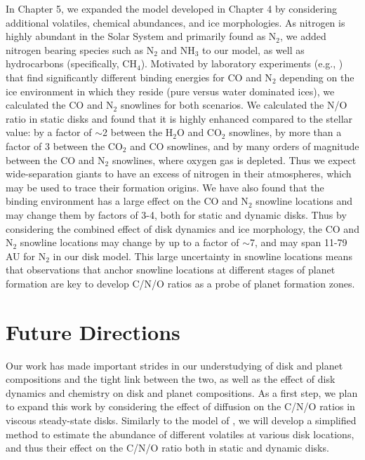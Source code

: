 In Chapter 5, we expanded the model developed in Chapter 4 by considering additional volatiles, chemical abundances, and ice morphologies. As nitrogen is highly abundant in the Solar System and primarily found as N$_2$, we added nitrogen bearing species such as N$_2$ and NH$_3$ to our model, as well as hydrocarbons (specifically, CH$_4$). Motivated by laboratory experiments (e.g., \citealt{fayolle16}) that find significantly different binding energies for CO and N$_2$ depending on the ice environment in which they reside (pure versus water dominated ices), we calculated the CO and N$_2$ snowlines for both scenarios. We calculated the N/O ratio in static disks and found that it is highly enhanced compared to the stellar value: by a factor of $\sim$2 between the H$_2$O and CO$_2$ snowlines, by more than a factor of 3 between the CO$_2$ and CO snowlines, and by many orders of magnitude between the CO and N$_2$ snowlines, where oxygen gas is depleted. Thus we expect wide-separation giants to have an excess of nitrogen in their atmospheres, which may be used to trace their formation origins. We have also found that the binding environment has a large effect on the CO and N$_2$ snowline locations and may change them by factors of 3-4, both for static and dynamic disks. Thus by considering the combined effect of disk dynamics and ice morphology, the CO and N$_2$ snowline locations may change by up to a factor of $\sim$7, and may span 11-79 AU for N$_2$ in our disk model. This large uncertainty in snowline locations means that observations that anchor snowline locations at different stages of planet
formation are key to develop C/N/O ratios as a probe of planet formation zones. 

\section{Future Directions}
\label{sec:future}

Our work has made important strides in our understudying of disk and planet compositions and the tight link between the two, as well as the effect of disk dynamics and chemistry on disk and planet compositions. As a first step, we plan to expand this work by considering the effect of diffusion on the C/N/O ratios in viscous steady-state disks. Similarly to the model of \citet{owen14}, we will develop a simplified method to estimate the abundance of different volatiles at various disk locations, and thus their effect on the C/N/O ratio both in static and dynamic disks. 

